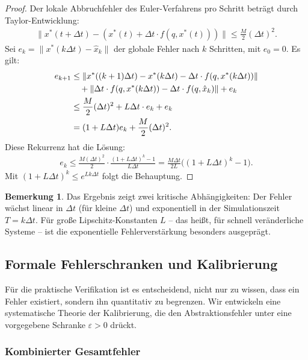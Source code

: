 ﻿\documentclass[a4paper,12pt]{article}
\theoremstyle{definition}
\newtheorem{remark}{Bemerkung}[section]
\begin{document}
\begin{proof}
Der lokale Abbruchfehler des Euler-Verfahrens pro Schritt beträgt durch Taylor-Entwicklung:
\begin{align}
  \|x^*(t + \Delta t) - (x^*(t) + \Delta t \cdot f(q, x^*(t)))\| \leq \frac{M}{2} (\Delta t)^2.
\end{align}
Sei $e_k = \|x^*(k\Delta t) - \hat{x}_k\|$ der globale Fehler nach $k$ Schritten, mit $e_0 = 0$. Es gilt:
\begin{align}
  e_{k+1} &\leq \|x^*(( k+1)\Delta t) - x^*(k\Delta t) - \Delta t \cdot f(q, x^*(k\Delta t))\| \\
           &\quad + \|\Delta t \cdot f(q, x^*(k\Delta t)) - \Delta t \cdot f(q, \hat{x}_k)\| + e_k \notag \\
           &\leq \frac{M}{2}(\Delta t)^2 + L \Delta t \cdot e_k + e_k \notag \\
           &= (1 + L\Delta t) e_k + \frac{M}{2}(\Delta t)^2. \notag
\end{align}
Diese Rekurrenz hat die Lösung:
\begin{align}
  e_k \leq \frac{M(\Delta t)^2}{2} \cdot \frac{(1+L\Delta t)^k - 1}{L\Delta t} = \frac{M\Delta t}{2L}\bigl((1+L\Delta t)^k - 1\bigr).
\end{align}
Mit $(1 + L\Delta t)^k \leq e^{Lk\Delta t}$ folgt die Behauptung.
\end{proof}

\begin{remark}
Das Ergebnis zeigt zwei kritische Abhängigkeiten: Der Fehler wächst linear in $\Delta t$ (für kleine $\Delta t$) und exponentiell in der Simulationszeit $T = k\Delta t$. Für große Lipschitz-Konstanten $L$ -- das heißt, für schnell veränderliche Systeme -- ist die exponentielle Fehlerverstärkung besonders ausgeprägt.
\end{remark}

\subsection{Formale Fehlerschranken und Kalibrierung}

Für die praktische Verifikation ist es entscheidend, nicht nur zu wissen, dass ein Fehler existiert, sondern ihn quantitativ zu begrenzen. Wir entwickeln eine systematische Theorie der Kalibrierung, die den Abstraktionsfehler unter eine vorgegebene Schranke $\varepsilon > 0$ drückt.

\subsubsection{Kombinierter Gesamtfehler}
\end{document}

